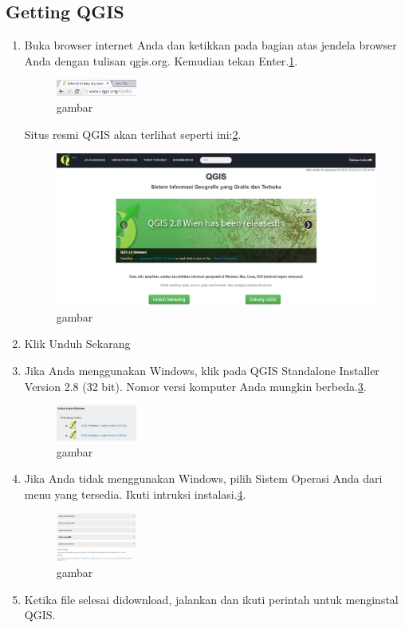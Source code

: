 \subsection{Getting QGIS}
\begin{enumerate}
\item
Buka browser internet Anda dan ketikkan pada bagian atas jendela browser Anda dengan tulisan qgis.org. Kemudian tekan Enter.\ref{image1}.
\begin{figure}[ht]
        \centerline{\includegraphics[width=0.25\textwidth]{figures/image1}}
        \caption{gambar}
        \label{image1}
        \end{figure}

Situs resmi QGIS akan terlihat seperti ini:\ref{image2}.
\begin{figure}[ht]
        \centerline{\includegraphics[width=1.00\textwidth]{figures/image2}}
        \caption{gambar}
        \label{image2}
        \end{figure}
\item
Klik Unduh Sekarang
\item
Jika Anda menggunakan Windows, klik pada QGIS Standalone Installer Version 2.8 (32 bit). Nomor versi komputer Anda mungkin berbeda.\ref{image3}.
\begin{figure}[ht]
        \centerline{\includegraphics[width=0.25\textwidth]{figures/image3}}
        \caption{gambar}
        \label{image3}
        \end{figure}
\item
Jika Anda tidak menggunakan Windows, pilih Sistem Operasi Anda dari menu yang tersedia. Ikuti intruksi instalasi.\ref{image4}.
\begin{figure}[ht]
        \centerline{\includegraphics[width=0.25\textwidth]{figures/image4}}
        \caption{gambar}
        \label{image4}
        \end{figure}
\item
Ketika file selesai didownload, jalankan dan ikuti perintah untuk menginstal QGIS.
\end{enumerate}

